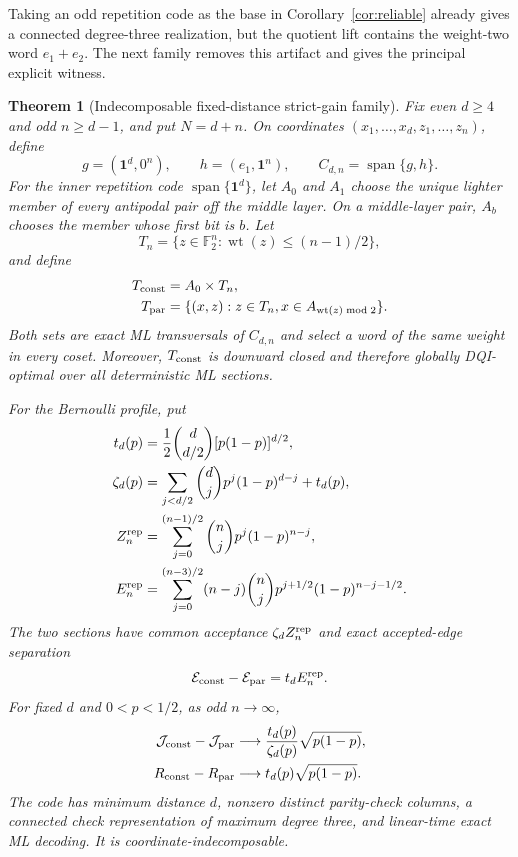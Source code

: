 \documentclass[journal]{IEEEtran}
\newtheorem{theorem}{Theorem}
\theoremstyle{definition}
\theoremstyle{remark}
\newcommand{\F}{\mathbb F}
\newcommand{\ind}{\mathbf 1}
\newcommand{\wt}{\operatorname{wt}}
\begin{document}
Taking an odd repetition code as the base in Corollary~\ref{cor:reliable}
already gives a connected degree-three realization, but the quotient lift
contains the weight-two word $e_1+e_2$.  The next family removes this artifact
and gives the principal explicit witness.

\begin{theorem}[Indecomposable fixed-distance strict-gain family]
\label{thm:twisted-family}
Fix even $d\ge4$ and odd $n\ge d-1$, and put $N=d+n$.  On coordinates
$(x_1,\ldots,x_d,z_1,\ldots,z_n)$, define
\begin{equation}
 g=(\ind^d,0^n),\qquad h=(e_1,\ind^n),\qquad
 C_{d,n}=\operatorname{span}\{g,h\}.
 \label{eq:twisted-code}
\end{equation}
For the inner repetition code $\operatorname{span}\{\ind^d\}$, let $A_0$
and $A_1$ choose the unique lighter member of every antipodal pair off the
middle layer.  On a middle-layer pair, $A_b$ chooses the member whose first
bit is $b$.  Let
\begin{equation}
 T_n=\{z\in\F_2^n:\wt(z)\le(n-1)/2\},
 \label{eq:outer-ball}
\end{equation}
and define
\begin{align}
 T_{\rm const}&=A_0\times T_n,
 \label{eq:twisted-const}\\
 T_{\rm par}&=\{(x,z):z\in T_n,
                  x\in A_{\wt(z)\bmod2}\}.
 \label{eq:twisted-par}
\end{align}
Both sets are exact ML transversals of $C_{d,n}$ and select a word of the
same weight in every coset.  Moreover, $T_{\rm const}$ is downward closed and
therefore globally DQI-optimal over all deterministic ML sections.

For the Bernoulli profile, put
\begin{align}
 t_d(p)&=\frac12\binom d{d/2}[p(1-p)]^{d/2},
 \label{eq:td}\\
 \zeta_d(p)&=\sum_{j<d/2}\binom djp^j(1-p)^{d-j}+t_d(p),
 \label{eq:zeta-d}\\
 Z_n^{\rm rep}&=\sum_{j=0}^{(n-1)/2}\binom njp^j(1-p)^{n-j},
 \label{eq:outer-Z}\\
 E_n^{\rm rep}&=\sum_{j=0}^{(n-3)/2}(n-j)\binom nj
 p^{j+1/2}(1-p)^{n-j-1/2}.
 \label{eq:outer-E}
\end{align}
The two sections have common acceptance $\zeta_dZ_n^{\rm rep}$ and exact
accepted-edge separation
\begin{equation}
 \mathcal E_{\rm const}-\mathcal E_{\rm par}
 =t_d E_n^{\rm rep}.
 \label{eq:twisted-exact-gap}
\end{equation}
For fixed $d$ and $0<p<1/2$, as odd $n\to\infty$,
\begin{align}
 \mathcal J_{\rm const}-\mathcal J_{\rm par}
 &\longrightarrow\frac{t_d(p)}{\zeta_d(p)}\sqrt{p(1-p)},
 \label{eq:twisted-J-limit}\\
 R_{\rm const}-R_{\rm par}
 &\longrightarrow t_d(p)\sqrt{p(1-p)}.
 \label{eq:twisted-R-limit}
\end{align}
The code has minimum distance $d$, nonzero distinct parity-check columns, a
connected check representation of maximum degree three, and linear-time exact
ML decoding.  It is coordinate-indecomposable.
\end{theorem}
\end{document}
